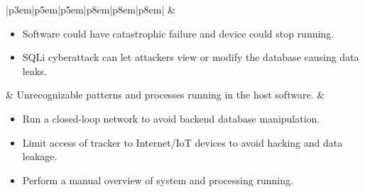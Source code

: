 \documentclass{article}
\begin{document}
\begin{table}[H]
\begin{tabular}{|p{3em}|p{5em}|p{5em}|p{8em}|p{8em}|p{8em}|}
		 & \begin{itemize}[nosep, wide=0pt, leftmargin=*, after=\strut]
			   \item Software could have catastrophic failure and device could stop running.
			   \item SQLi cyberattack can let attackers view or modify the database causing data leaks.
		   \end{itemize}
		 & Unrecognizable patterns and processes running in the host software.
		 & \begin{minipage}[t]{\linewidth}
			   \begin{itemize}[nosep, wide=0pt, leftmargin=*, after=\strut]
			   \item Run a closed-loop network to avoid backend database manipulation.
			   \item Limit access of tracker to Internet/IoT devices to avoid hacking and data leakage.
			   \item Perform a manual overview of system and processing running.
			\end{itemize}
		   \end{minipage}  \tabularnewline{}

	\end{tabular}%
	\caption{\label{tab:HostSoftware}Host Software FMEA \\\hspace{0.1\textwidth} \textbf{Req:} \hyperref[SR1]{SR1},\hyperref[SR2]{SR2}}
	\end{table}
	
\end{document}
